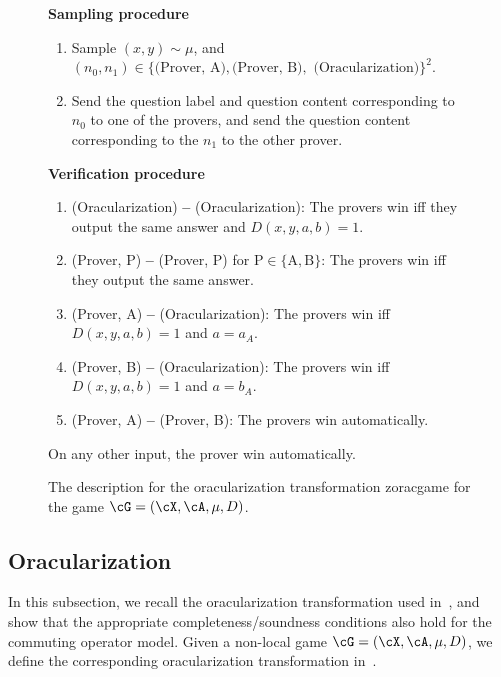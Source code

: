 \begin{figure}[!b]
\begin{gamespec}
		\begin{center}
			\textbf{Sampling procedure}
		\end{center}
		\begin{enumerate}
			\item Sample $(x,y) \sim \mu$, and $(n_0, n_1) \in \{ \text{(Prover, A)}, \text{(Prover, B)},  \text{	(Oracularization)} \}^2$. 
			\item Send the question label and question content corresponding to $n_0$ to one of the provers, and send the question content corresponding to the $n_1$ to the other prover.
		\end{enumerate}
		\begin{center}
			\textbf{Verification procedure}
		\end{center}
		\begin{enumerate}
			\item (Oracularization) \textbf{--} (Oracularization): The provers win iff they output the same answer and $D(x,y,a,b) = 1$. 
			\item (Prover, P) \textbf{--} (Prover, P) for $\text{P} \in \{\text{A},\text{B}\}$: The provers win iff they output the same answer. 
			\item (Prover, A) \textbf{--} (Oracularization): The provers win iff $D(x,y,a,b) = 1$ and $a = a_A$. 
			\item (Prover, B) \textbf{--} (Oracularization): The provers win iff $D(x,y,a,b) = 1$ and $a = b_A$. 
			\item (Prover, A) \textbf{--} (Prover, B): The provers win automatically. 
		\end{enumerate}
		On any other input, the prover win automatically. 
		\vspace{1em}
	\end{gamespec}
	\caption{ The description for the oracularization transformation \gls{zoracgame} for the game $\cG = (\cX, \cA,\mu, D)$. }
	\label{fig:Oracularization}
\end{figure}


\subsection{Oracularization} \label{sec:Oracularization}
In this subsection, we recall the oracularization transformation used in~\cite[Section 9]{jiMIPRE2022a}, and show that the appropriate completeness/soundness conditions also hold for the commuting operator model. Given a non-local game $\cG = (\cX, \cA, \mu , D)$, we define the corresponding oracularization transformation in~. 


